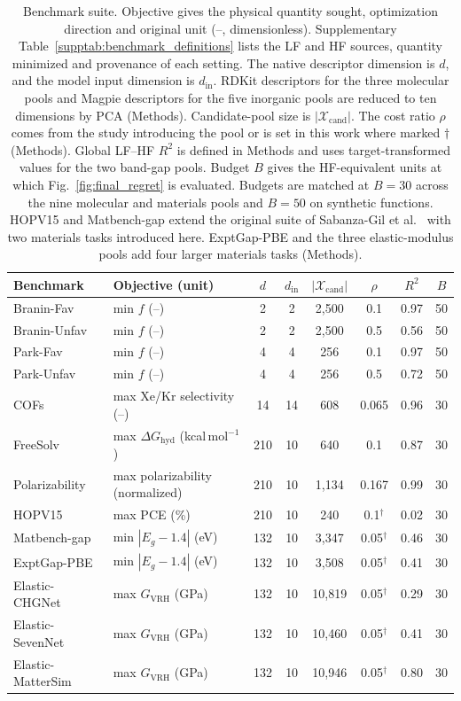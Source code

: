 \documentclass[pdflatex,sn-nature,iicol]{sn-jnl}%
\begin{document}
\begin{table}[t]
\centering
\footnotesize
\caption{Benchmark suite. Objective gives the physical quantity sought, optimization direction and original unit (--, dimensionless). Supplementary Table~\ref{supptab:benchmark_definitions} lists the LF and HF sources, quantity minimized and provenance of each setting. The native descriptor dimension is $d$, and the model input dimension is $d_{\mathrm{in}}$. RDKit descriptors for the three molecular pools and Magpie descriptors for the five inorganic pools are reduced to ten dimensions by PCA (Methods). Candidate-pool size is $|\mathcal{X}_{\mathrm{cand}}|$. The cost ratio $\rho$ comes from the study introducing the pool or is set in this work where marked $\dagger$ (Methods). Global LF--HF $R^2$ is defined in Methods and uses target-transformed values for the two band-gap pools. Budget $B$ gives the HF-equivalent units at which Fig.~\ref{fig:final_regret} is evaluated. Budgets are matched at $B = 30$ across the nine molecular and materials pools and $B = 50$ on synthetic functions. HOPV15 and Matbench-gap extend the original suite of Sabanza-Gil et al.~\citep{sabanza2025best} with two materials tasks introduced here. ExptGap-PBE and the three elastic-modulus pools add four larger materials tasks (Methods).}
\label{tab:benchmarks}
\begin{tabular}{llcccccc}
\toprule
\textbf{Benchmark} & \textbf{Objective (unit)} & $d$ & $d_{\mathrm{in}}$ & $|\mathcal{X}_{\mathrm{cand}}|$ & $\rho$ & $R^2$ & $B$ \\
\midrule
Branin-Fav & min $f$ (--) & 2 & 2 & 2{,}500 & 0.1 & 0.97 & 50 \\
Branin-Unfav & min $f$ (--) & 2 & 2 & 2{,}500 & 0.5 & 0.56 & 50 \\
Park-Fav & min $f$ (--) & 4 & 4 & 256 & 0.1 & 0.97 & 50 \\
Park-Unfav & min $f$ (--) & 4 & 4 & 256 & 0.5 & 0.72 & 50 \\
COFs & max Xe/Kr selectivity (--) & 14 & 14 & 608 & 0.065 & 0.96 & 30 \\
FreeSolv & max $\Delta G_{\mathrm{hyd}}$ (kcal\,mol$^{-1}$) & 210 & 10 & 640 & 0.1 & 0.87 & 30 \\
Polarizability & max polarizability (normalized) & 210 & 10 & 1{,}134 & 0.167 & 0.99 & 30 \\
HOPV15 & max PCE (\%) & 210 & 10 & 240 & 0.1$^{\dagger}$ & 0.02 & 30 \\
Matbench-gap & min $|E_g - 1.4|$ (eV) & 132 & 10 & 3{,}347 & 0.05$^{\dagger}$ & 0.46 & 30 \\
ExptGap-PBE & min $|E_g - 1.4|$ (eV) & 132 & 10 & 3{,}508 & 0.05$^{\dagger}$ & 0.41 & 30 \\
Elastic-CHGNet & max $G_{\mathrm{VRH}}$ (GPa) & 132 & 10 & 10{,}819 & 0.05$^{\dagger}$ & 0.29 & 30 \\
Elastic-SevenNet & max $G_{\mathrm{VRH}}$ (GPa) & 132 & 10 & 10{,}460 & 0.05$^{\dagger}$ & 0.41 & 30 \\
Elastic-MatterSim & max $G_{\mathrm{VRH}}$ (GPa) & 132 & 10 & 10{,}946 & 0.05$^{\dagger}$ & 0.80 & 30 \\
\bottomrule
\end{tabular}
\end{table}
\end{document}
